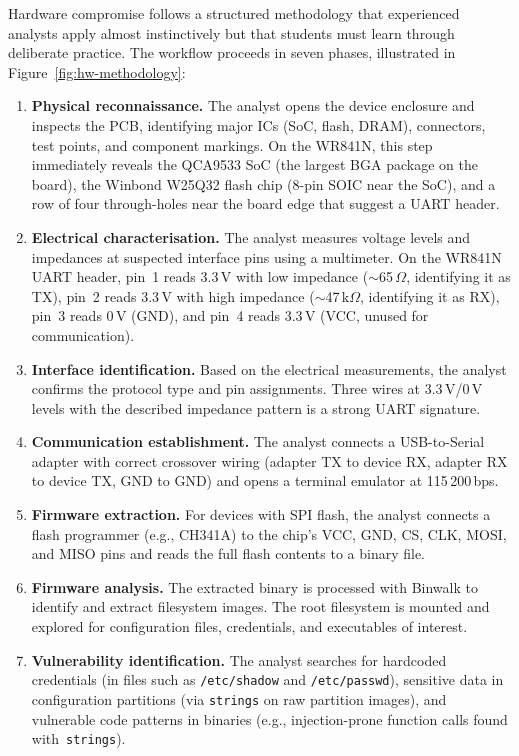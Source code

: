 Hardware compromise follows a structured methodology that experienced analysts apply almost instinctively but that students must learn through deliberate practice. The workflow proceeds in seven phases, illustrated in Figure~\ref{fig:hw-methodology}:

\begin{enumerate}
    \item \textbf{Physical reconnaissance.} The analyst opens the device enclosure and inspects the PCB, identifying major ICs (SoC, flash, DRAM), connectors, test points, and component markings. On the WR841N, this step immediately reveals the QCA9533 SoC (the largest BGA package on the board), the Winbond W25Q32 flash chip (8-pin SOIC near the SoC), and a row of four through-holes near the board edge that suggest a UART header.

    \item \textbf{Electrical characterisation.} The analyst measures voltage levels and impedances at suspected interface pins using a multimeter. On the WR841N UART header, pin~1 reads 3.3\,V with low impedance ($\sim$65\,$\Omega$, identifying it as TX), pin~2 reads 3.3\,V with high impedance ($\sim$47\,k$\Omega$, identifying it as RX), pin~3 reads 0\,V (GND), and pin~4 reads 3.3\,V (VCC, unused for communication).

    \item \textbf{Interface identification.} Based on the electrical measurements, the analyst confirms the protocol type and pin assignments. Three wires at 3.3\,V/0\,V levels with the described impedance pattern is a strong UART signature.

    \item \textbf{Communication establishment.} The analyst connects a USB-to-Serial adapter with correct crossover wiring (adapter TX to device RX, adapter RX to device TX, GND to GND) and opens a terminal emulator at 115\,200\,bps.

    \item \textbf{Firmware extraction.} For devices with SPI flash, the analyst connects a flash programmer (e.g., CH341A) to the chip's VCC, GND, CS, CLK, MOSI, and MISO pins and reads the full flash contents to a binary file.

    \item \textbf{Firmware analysis.} The extracted binary is processed with Binwalk to identify and extract filesystem images. The root filesystem is mounted and explored for configuration files, credentials, and executables of interest.

    \item \textbf{Vulnerability identification.} The analyst searches for hardcoded credentials (in files such as \texttt{/etc/shadow} and \texttt{/etc/passwd}), sensitive data in configuration partitions (via \texttt{strings} on raw partition images), and vulnerable code patterns in binaries (e.g., injection-prone function calls found with~\texttt{strings}).
\end{enumerate}

